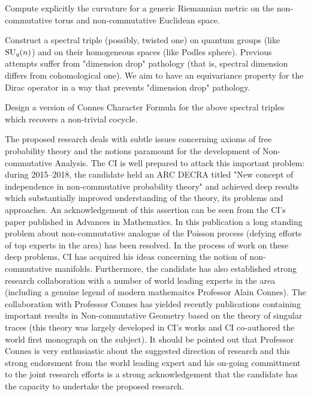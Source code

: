 \documentclass{article}
\newcommand{\archeading}[1]{\vspace{.3cm} \noindent{\bfseries #1} \vspace{.1cm}   }
\begin{document}
 Compute explicitly the curvature for a generic Riemannian metric on the non-commutative torus and non-commutative Euclidean space.

 Construct a spectral triple (possibly, twisted one) on quantum groups (like ${\rm SU}_q(n)$) and on their homogeneous spaces (like Podles sphere). Previous attempts \cite{ChakrabortyPal} suffer from "dimension drop" pathology (that is, spectral dimension differs from cohomological one). We aim to have an equivariance property for the Dirac operator in a way that prevents "dimension drop" pathology. 

 Design a version of Connes Character Formula for the above spectral triples which recovers a non-trivial cocycle.

\bigskip\archeading{Future Fellowship Candidate}

The proposed research deals with subtle issues concerning axioms of free probability theory and the notions
paramount for the development of Non-commutative Analysis. The CI is well prepared to attack this important problem: during 2015--2018, the candidate held an ARC DECRA titled "New concept of independence in non-commutative probability theory" and achieved deep results which substantially improved understanding of the theory, its problems and approaches. An acknowledgement of this assertion can be seen from the CI's paper \cite{JSZ_advances} published in Advances in Mathematics. In this publication a long standing problem about non-commutative analogue of the Poisson process (defying efforts of top experts in the area) has been resolved. In the process of work on these deep problems, CI has acquired his ideas concerning the notion of non-commutative manifolds. Furthermore,
the candidate has also established strong research collaboration with a number of world leading experts in the area (including a genuine legend of modern mathemaitcs Professor Alain Connes). The collaboration with Professor Connes has yielded recently publications \cite{Connes_team} containing important results in Non-commutative Geometry based on the theory of singular traces (this theory was largely developed in CI's works and CI co-authored the world first monograph \cite{book} on the subject). It should be pointed out that Professor Connes is very enthusiastic about the suggested direction of research
and this strong endorsment from the world leading expert and his on-going committment to the joint research efforts is a strong acknowledgement that the candidate has the capacity to undertake the proposed research.
\end{document}
